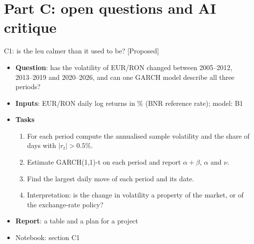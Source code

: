 \section{Part C: open questions and AI critique}

\begin{frame}{C1: is the leu calmer than it used to be? [Proposed]}
\itemsize{\footnotesize}
\begin{itemize}
\item \textbf{Question}: has the volatility of EUR/RON changed between 2005--2012, 2013--2019 and 2020--2026, and can one GARCH model describe all three periods?
\item \textbf{Inputs}: EUR/RON daily log returns in \% (BNR reference rate); model: B1
\item \textbf{Tasks}
\begin{enumerate}
    \item For each period compute the annualised sample volatility and the share of days with $|r_t| > 0.5\%$.
    \item Estimate GARCH(1,1)-t on each period and report $\alpha + \beta$, $\alpha$ and $\nu$.
    \item Find the largest daily move of each period and its date.
    \item Interpretation: is the change in volatility a property of the market, or of the exchange-rate policy?
\end{enumerate}
\item \textbf{Report}: a table and a plan for a project
\item Notebook: section C1
\end{itemize}
\end{frame}

